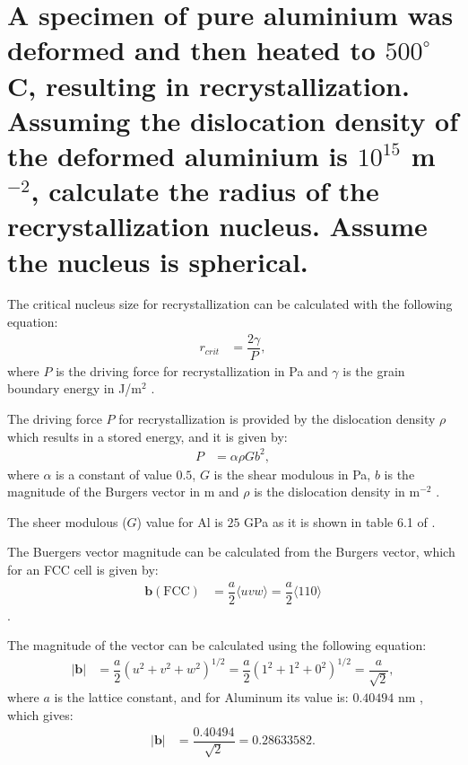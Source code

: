 \newpage
\section{A specimen of pure aluminium was deformed and then heated to $500^{\circ}$C, resulting in recrystallization. Assuming the dislocation density of the deformed aluminium is $10^{15}$ m$^{-2}$, calculate the radius of the recrystallization nucleus. Assume the nucleus is spherical.}

The critical nucleus size for recrystallization can be calculated with the following equation:
\begin{align}
    \label{eq:r_recrystallization}
    r_{crit}&=\dfrac{2\gamma}{P},
\end{align}
where $P$ is the driving force for recrystallization in Pa and $\gamma$ is the grain boundary energy in J/m$^2$ \citep[p.~283]{rollett2017recrystallization}.

The driving force $P$ for recrystallization is provided by the dislocation density $\rho$ which results in a stored energy, and it is given by:
\begin{align}
    \label{eq:drivin_force}
    P&=\alpha \rho Gb^2,
\end{align}
where $\alpha$ is a constant of value $0.5$, $G$ is the shear modulous in Pa, $b$ is the magnitude of the Burgers vector in m and $\rho$ is the dislocation density in m$^{-2}$ \citep[p.~249]{rollett2017recrystallization}.

The sheer modulous ($G$) value for Al is $25$ GPa as it is shown in table 6.1 of \citet[p.~157]{callister2010materials}.

The Buergers vector magnitude can be calculated from the Burgers vector, which for an FCC cell is given by:
\begin{align}
    \label{eq:fcc_vector}
    \mathbf{b}(\text{FCC})&=\dfrac{a}{2}\langle uvw\rangle=\dfrac{a}{2}\langle110\rangle
\end{align}
\citep[p.~204]{callister2010materials}.

The magnitude of the vector can be calculated using the following equation:
\begin{align}
    \label{eq:vector_magnitude}
    \left|\mathbf{b}\right|&=\dfrac{a}{2}\left(u^{2}+v^{2}+w^{2}\right)^{1/2}=\dfrac{a}{2}\left(1^{2}+1^{2}+0^{2}\right)^{1/2}=\dfrac{a}{\sqrt{2}},
\end{align}
where $a$ is the lattice constant, and for Aluminum its value is: $0.40494$ nm \citep{Xu2011}, which gives:
\begin{align}
    \label{eq:vector_magnitude01}
    \left|\mathbf{b}\right|&=\dfrac{0.40494}{\sqrt{2}}=0.28633582.
\end{align}

